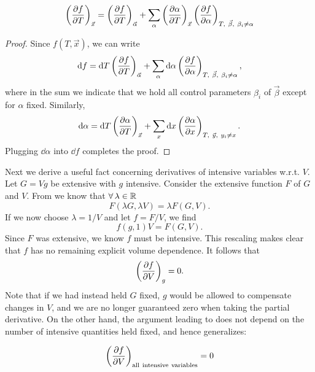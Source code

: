 \begin{proposition}{}{}
\begin{equation*}
\left( \pdv{f}{T} \right)_{\vec{x}} =  \left(\pdv{f}{T}\right)_{\vec\alpha}
+\sum_\alpha 
\left(\pdv{\alpha}{T}\right)_{\vec{x}}
\left(\pdv{f}{\alpha}\right)_{T,~\vec{\beta},~\beta_i\neq\alpha} 
\end{equation*}
\begin{proof}
Since $f(T,\vec{x})$, we can write
\begin{equation*}
\dd f=\dd{T} \left( \pdv{f}{T} \right)_{\vec{\alpha}} 
+ \sum_\alpha\dd\alpha\left(\pdv{f}{\alpha}\right)_{T,~\vec{\beta},~\beta_i\neq\alpha},
\end{equation*}
where in the sum we indicate that we hold all control parameters $\beta_i$ of
$\vec{\beta}$ except for $\alpha$ fixed. Similarly,
\begin{equation*}
\dd\alpha=\dd{T} \left( \pdv{\alpha}{T} \right)_{\vec{x}} 
+ \sum_x\dd x\left(\pdv{\alpha}{x}\right)_{T,~\vec{y},~y_i\neq x}.
\end{equation*}
Plugging $\dd \alpha$ into $\dd f$ completes the proof.
\end{proof}
\end{proposition}

Next we derive a useful fact concerning derivatives of intensive variables
w.r.t. $V$. Let $G=Vg$ be extensive with $g$ intensive.
Consider the extensive function $F$ of $G$ and $V$. 
From  we know that $\operatorname{\forall}\lambda\in\mathbb{R}$
\begin{equation}
F(\lambda G,\lambda V)=\lambda F(G,V).
\end{equation}
If we now choose $\lambda = 1/V$ and let $f=F/V$, we find
\begin{equation}\label{eq:fintensive}
f(g,1) V=F(G,V).
\end{equation}
Since $F$ was extensive, we know $f$ must be intensive. This 
rescaling makes clear that $f$ has no remaining explicit volume dependence.
It follows that
\begin{equation}\label{eq:dfdVintensive}
\left(\pdv{f}{V}\right)_{g}=0.
\end{equation}
Note that if we had instead held $G$ fixed, $g$ would be allowed to compensate
changes in $V$, and we are no longer guaranteed zero when taking the partial
derivative. On the other hand, the argument leading to
 does not depend on the number of 
intensive quantities held fixed, and hence generalizes: 
\begin{proposition}{}{}
$$
\left(\pdv{f}{V}\right)_{{\rm all~intensive~variables}}=0
$$
\end{proposition}



